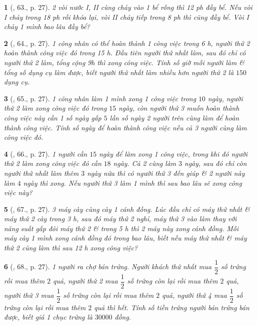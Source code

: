 \documentclass{article}
\newtheorem{baitoan}{}
\begin{document}
\begin{baitoan}[\cite{Binh_Toan_6_tap_2}, 63., p. 27]
	2 vòi nước I, II cùng chảy vào 1 bể rỗng thì {\rm12 ph} đầy bể. Nếu vòi I chảy trong {\rm18 ph} rồi khóa lại, vòi II chảy tiếp trong {\rm8 ph} thì cũng đầy bể. Vòi I chảy 1 mình bao lâu đầy bể?
\end{baitoan}

\begin{baitoan}[\cite{Binh_Toan_6_tap_2}, 64., p. 27]
	1 công nhân có thể hoàn thành 1 công việc trong {\rm6 h}, người thứ 2 hoàn thành công việc đó trong {\rm15 h}. Đầu tiên người thứ nhất làm, sau đó chỉ có người thứ 2 làm, tổng cộng {\rm9h} thì xong công việc. Tính số giờ mỗi người làm \& tổng số dụng cụ làm được, biết người thứ nhất làm nhiều hơn người thứ 2 là $150$ dụng cụ.
\end{baitoan}

\begin{baitoan}[\cite{Binh_Toan_6_tap_2}, 65., p. 27]
	1 công nhân làm 1 mình xong 1 công việc trong $10$ ngày, người thứ 2 làm xong công việc đó trong $15$ ngày, còn người thứ 3 muốn hoàn thành công việc này cần 1 số ngày gấp $5$ lần số ngày 2 người trên cùng làm để hoàn thành công việc. Tính số ngày để hoàn thành công việc nếu cả 3 người cùng làm công việc đó.
\end{baitoan}

\begin{baitoan}[\cite{Binh_Toan_6_tap_2}, 66., p. 27]
	1 người cần $15$ ngày để làm xong 1 công việc, trong khi đó người thứ 2 làm xong công việc đó cần $18$ ngày. Cả 2 cùng làm $3$ ngày, sau đó chỉ còn người thứ nhất làm thêm $3$ ngày nữa thì có người thứ 3 đến giúp \& 2 người này làm $4$ ngày thì xong. Nếu người thứ 3 làm 1 mình thì sau bao lâu sẽ xong công việc này?
\end{baitoan}

\begin{baitoan}[\cite{Binh_Toan_6_tap_2}, 67., p. 27]
	3 máy cày cùng cày 1 cánh đồng. Lúc đầu chỉ có máy thứ nhất \& máy thứ 2 cày trong {\rm3 h}, sau đó máy thứ 2 nghỉ, máy thứ 3 vào làm thay với năng suất gấp đôi máy thứ 2 \& trong {\rm5 h} thì 2 máy này xong cánh đồng. Mỗi máy cày 1 mình xong cánh đồng đó trong bao lâu, biết nếu máy thứ nhất \& máy thứ 2 cùng làm thì sau {\rm12 h} xong công việc?
\end{baitoan}

\begin{baitoan}[\cite{Binh_Toan_6_tap_2}, 68., p. 27]
	1 người ra chợ bán trứng. Người khách thứ nhất mua $\dfrac{1}{2}$ số trứng rồi mua thêm $2$ quả, người thứ 2 mua $\dfrac{1}{2}$ số trứng còn lại rồi mua thêm $2$ quả, người thứ 3 mua $\dfrac{1}{2}$ số trứng còn lại rồi mua thêm $2$ quả, người thứ 4 mua $\dfrac{1}{2}$ số trứng còn lại rồi mua thêm $2$ quả thì hết. Tính số tiền trứng người bán trứng bán được, biết giá 1 chục trứng là $30000$ đồng.
\end{baitoan}
\end{document}
